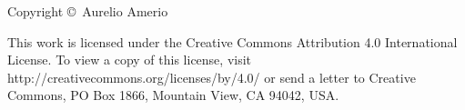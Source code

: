 \vspace*{\fill}
\begin{minipage}[b]{0.9\textwidth}
	\footnotesize\raggedright
	\setlength{\parskip}{0.5\baselineskip}
	Copyright \copyright \the\year\ Aurelio Amerio\par This work is licensed under the Creative Commons Attribution 4.0 International License.
	To view a copy of this license, visit http://creativecommons.org/licenses/by/4.0/ or send a letter to Creative Commons, PO Box 1866, Mountain View, CA 94042, USA.
\end{minipage}
